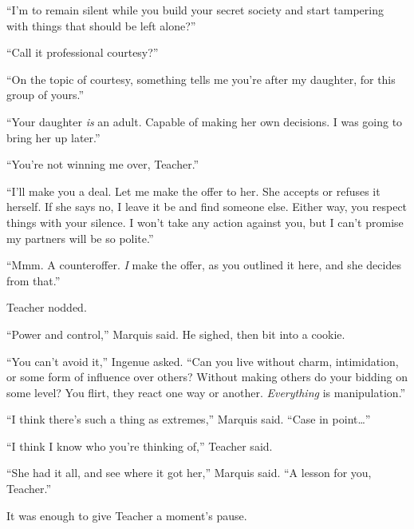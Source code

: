 ``I'm to remain silent while you build your secret society and start tampering with things that should be left alone?''



``Call it professional courtesy?''



``On the topic of courtesy, something tells me you're after my daughter, for this group of yours.''



``Your daughter \emph{is} an adult.  Capable of making her own decisions.  I was going to bring her up later.''



``You're not winning me over, Teacher.''



``I'll make you a deal.  Let me make the offer to her.  She accepts or refuses it herself.  If she says no, I leave it be and find someone else.  Either way, you respect things with your silence.  I won't take any action against you, but I can't promise my partners will be so polite.''



``Mmm.  A counteroffer.  \emph{I} make the offer, as you outlined it here, and she decides from that.''



Teacher nodded.



``Power and control,'' Marquis said.  He sighed, then bit into a cookie.



``You can't avoid it,''  Ingenue asked.  ``Can you live without charm, intimidation, or some form of influence over others?  Without making others do your bidding on some level?  You flirt, they react one way or another.  \emph{Everything} is manipulation.''



``I think there's such a thing as extremes,'' Marquis said.  ``Case in point\ldots''



``I think I know who you're thinking of,'' Teacher said.



``She had it all, and see where it got her,'' Marquis said.  ``A lesson for you, Teacher.''



It was enough to give Teacher a moment's pause.





